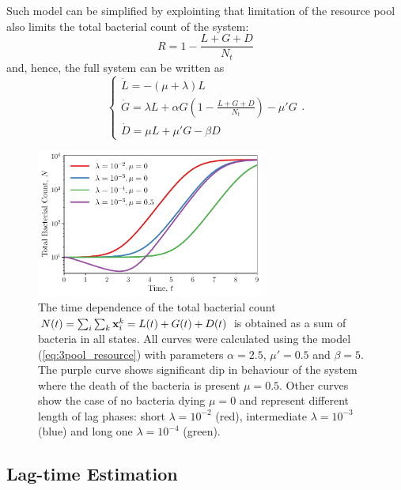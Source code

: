 \documentclass[10pt,A4paper]{article}
\begin{document}
Such model can be simplified by explointing that limitation of the resource pool also limits the total bacterial count of the system:
\begin{equation}
    R = 1 - \frac{L+G+D}{N_t}
\end{equation}
and, hence, the full system can be written as
\begin{equation}
    \begin{cases}
        \dot{L} = -(\mu + \lambda) L\\
        \dot{G} = \lambda L + \alpha G\left(1-\frac{L+G+D}{N_t}\right)-\mu' G\\
        \dot{D} = \mu  L + \mu' G- \beta D 
        \label{eq:3pool_resource} 
    \end{cases}.
\end{equation}


\begin{figure}[t]
    \begin{center}
    \includegraphics[width=0.67\textwidth]{Figures/pool_model_3pools_resource.pdf}
    \caption{{\footnotesize The time dependence of the total bacterial count $N(t) = \sum_i \sum_k \mathbf{x}_i^k = L(t) + G(t) + D(t)$ is obtained as a sum of bacteria in all states.
    All curves were calculated using the model (\ref{eq:3pool_resource}) with parameters $\alpha=2.5$, $\mu'=0.5$ and $\beta=5$.
    The purple curve shows significant dip in behaviour of the system where the death of the bacteria is present $\mu = 0.5$.
    Other curves show the case of no bacteria dying $\mu=0$ and represent different length of lag phases:
    short $\lambda=10^{-2}$ (red), intermediate $\lambda=10^{-3}$ (blue) and long one $\lambda=10^{-4}$ (green).
}}
    \label{fig:3pool_resource_plots}
    \end{center}
\end{figure}

\subsection{Lag-time Estimation}
\end{document}
